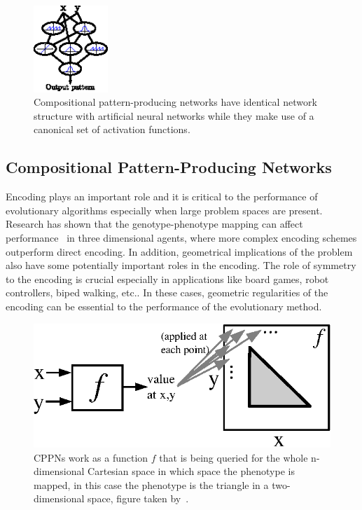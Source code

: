 \begin{figure}[t!]
\centering
\includegraphics[width=0.25\textwidth]{../Figures/Misc/cppnNetwork.eps}
\caption{Compositional pattern-producing networks have identical network structure with artificial neural networks while they make use of a canonical set of activation functions.}
\label{fig:cppnNetwork}
\end{figure}



\subsection{Compositional Pattern-Producing Networks}
\label{CPPN}

Encoding plays an important role and it is critical to the performance of evolutionary algorithms especially when large problem spaces are present. Research has shown that the genotype-phenotype mapping can affect performance~\citep{komosinski2001comparison} in three dimensional agents, where more complex encoding schemes outperform direct encoding. In addition, geometrical implications of the problem also have some potentially important roles in the encoding. The role of symmetry to the encoding is crucial especially in applications like board games, robot controllers, biped walking, etc.. In these cases, geometric regularities of the encoding can be essential to the performance of the evolutionary method.

\begin{figure}[t!]
\centering
\includegraphics{../Figures/Misc/cppnResolution.eps}
\caption{CPPNs work as a function $f$ that is being queried for the whole n-dimensional Cartesian space in which space the phenotype is mapped, in this case the phenotype is the triangle in a two-dimensional space, figure taken by~\citep{stanley2007compositional}.}
\label{fig:cppnResolution}
\end{figure}

